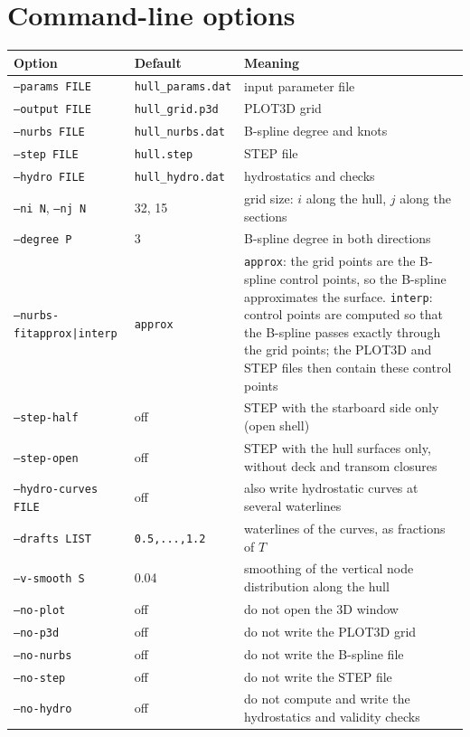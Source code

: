 \documentclass[11pt,a4paper]{article}
\newcommand{\cmd}[1]{\texttt{#1}}
\begin{document}
\section{Command-line options}
\begin{longtable}{L{4.3cm}L{2.9cm}L{8.1cm}}
\toprule
Option & Default & Meaning \\ \midrule
\cmd{--params FILE} & \cmd{hull\_params.dat} & input parameter file \\
\cmd{--output FILE} & \cmd{hull\_grid.p3d} & PLOT3D grid \\
\cmd{--nurbs FILE} & \cmd{hull\_nurbs.dat} & B-spline degree and knots \\
\cmd{--step FILE} & \cmd{hull.step} & STEP file \\
\cmd{--hydro FILE} & \cmd{hull\_hydro.dat} & hydrostatics and checks \\
\cmd{--ni N}, \cmd{--nj N} & 32, 15 & grid size: $i$ along the hull, $j$ along the sections \\
\cmd{--degree P} & 3 & B-spline degree in both directions \\
\cmd{--nurbs-fit}\newline\cmd{approx|interp} & \cmd{approx} & \cmd{approx}: the grid points are the B-spline
control points, so the B-spline approximates the surface. \cmd{interp}: control points are
computed so that the B-spline passes exactly through the grid points; the PLOT3D and STEP files
then contain these control points \\
\cmd{--step-half} & off & STEP with the starboard side only (open shell) \\
\cmd{--step-open} & off & STEP with the hull surfaces only, without deck and transom closures \\
\cmd{--hydro-curves FILE} & off & also write hydrostatic curves at several waterlines \\
\cmd{--drafts LIST} & \cmd{0.5,...,1.2} & waterlines of the curves, as fractions of $T$ \\
\cmd{--v-smooth S} & 0.04 & smoothing of the vertical node distribution along the hull \\
\cmd{--no-plot} & off & do not open the 3D window \\
\cmd{--no-p3d} & off & do not write the PLOT3D grid \\
\cmd{--no-nurbs} & off & do not write the B-spline file \\
\cmd{--no-step} & off & do not write the STEP file \\
\cmd{--no-hydro} & off & do not compute and write the hydrostatics and validity checks \\
\bottomrule
\end{longtable}
\end{document}
